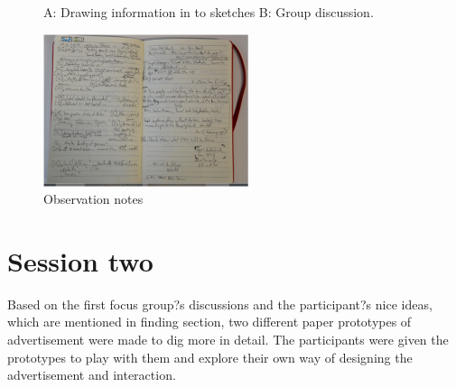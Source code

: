 \begin{figure}[!htb]
    \centering
    \hfill
    \caption{A: Drawing information in to sketches B: Group discussion. }%
    \label{fig:observation_env}%
\end{figure}


\begin{figure}[H]
    \centering
    \includegraphics[width=6cm]{Figures/4/notes}%
    \caption{Observation notes}%
    \label{fig:observation_env}%
\end{figure}


\section{Session two }
Based on the first focus group?s discussions and the participant?s nice ideas, which are mentioned in finding section, two different paper prototypes of advertisement were made to dig more in detail. The participants were given the prototypes to play with them and explore their own way of designing the advertisement and interaction.

